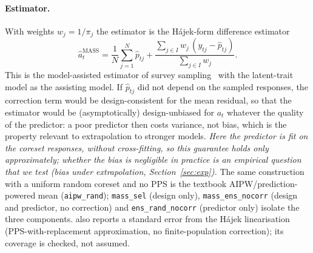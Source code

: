 \paragraph{Estimator.}
With weights $w_j=1/\pi_j$ the estimator is the H\'ajek-form difference estimator
\begin{equation}
\hat a_t^{\mathrm{MASS}}=\frac1N\sum_{j=1}^N\hat p_{tj}+\frac{\sum_{j\in I}w_j\,(y_{tj}-\hat p_{tj})}{\sum_{j\in I}w_j}.
\end{equation}
This is the model-assisted estimator of survey sampling~\citep{sarndal1992model} with the latent-trait model as the assisting model. If $\hat p_{tj}$ did not depend on the sampled responses, the correction term would be design-consistent for the mean residual, so that the estimator would be (asymptotically) design-unbiased for $a_t$ whatever the quality of the predictor: a poor predictor then costs variance, not bias, which is the property relevant to extrapolation to stronger models. \emph{Here the predictor \emph{is} fit on the coreset responses, without cross-fitting, so this guarantee holds only approximately; whether the bias is negligible in practice is an empirical question that we test (bias under extrapolation, Section~\ref{sec:exp}).}
The same construction with a uniform random coreset and no PPS is the textbook AIPW/prediction-powered mean (\texttt{aipw\_rand}); \texttt{mass\_sel} (design only), \texttt{mass\_ens\_nocorr} (design and predictor, no correction) and \texttt{ens\_rand\_nocorr} (predictor only) isolate the three components.
\mass{} also reports a standard error from the H\'ajek linearisation (PPS-with-replacement approximation, no finite-population correction); its coverage is checked, not assumed.
